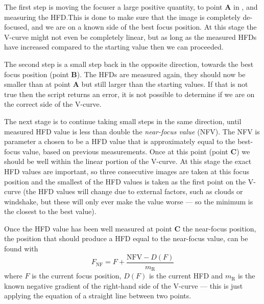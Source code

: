 \begin{colsection}
\begin{colsection}
The first step is moving the focuser a large positive quantity, to point \textbf{A} in , and measuring the HFD.\@ This is done to make sure that the image is completely de-focused, and we are on a known side of the best focus position. At this stage the V-curve might not even be completely linear, but as long as the measured HFDs have increased compared to the starting value then we can proceeded.

The second step is a small step back in the opposite direction, towards the best focus position (point \textbf{B}). The HFDs are measured again, they should now be smaller than at point \textbf{A} but still larger than the starting values. If that is not true then the script returns an error, it is not possible to determine if we are on the correct side of the V-curve.

The next stage is to continue taking small steps in the same direction, until measured HFD value is less than double the \emph{near-focus value} (NFV). The NFV is parameter a chosen to be a HFD value that is approximately equal to the best-focus value, based on previous measurements. Once at this point (point \textbf{C}) we should be well within the linear portion of the V-curve. At this stage the exact HFD values are important, so three consecutive images are taken at this focus position and the smallest of the HFD values is taken as the first point on the V-curve (the HFD values will change due to external factors, such as clouds or windshake, but these will only ever make the value worse --- so the minimum is the closest to the best value).

Once the HFD value has been well measured at point \textbf{C} the near-focus position, the position that should produce a HFD equal to the near-focus value, can be found with
%
\begin{equation}
    F_\text{NF} = F + \frac{\text{NFV} - D(F)}{m_\text{R}}
    \label{eq:nearfocus}
\end{equation}
%
where $F$ is the current focus position, $D(F)$ is the current HFD and $m_\text{R}$ is the known negative gradient of the right-hand side of the V-curve --- this is just applying the equation of a straight line between two points.


\end{colsection}
\end{colsection}
